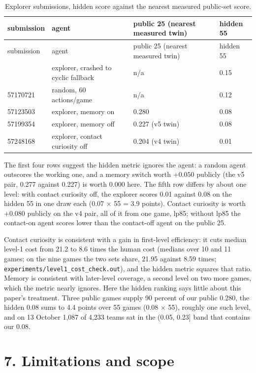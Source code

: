 \documentclass[
  11pt,
]{article}
\begin{document}
\begin{longtable}[]{@{}llll@{}}
\caption{Explorer submissions, hidden score against the nearest measured
public-set score.}\tabularnewline
\toprule\noalign{}
submission & agent & public 25 (nearest measured twin) & hidden 55 \\
\midrule\noalign{}
\endfirsthead
\toprule\noalign{}
submission & agent & public 25 (nearest measured twin) & hidden 55 \\
\midrule\noalign{}
\endhead
\bottomrule\noalign{}
\endlastfoot
57095368 & explorer, crashed to cyclic fallback & n/a & 0.15 \\
57170721 & random, 60 actions/game & n/a & 0.12 \\
57123503 & explorer, memory on & 0.280 & 0.08 \\
57199354 & explorer, memory off & 0.227 (v5 twin) & 0.08 \\
57248168 & explorer, contact curiosity off & 0.204 (v4 twin) & 0.01 \\
\end{longtable}

The first four rows suggest the hidden metric ignores the agent: a
random agent outscores the working one, and a memory switch worth
\(+0.050\) publicly (the v5 pair, 0.277 against 0.227) is worth 0.000
here. The fifth row differs by about one level: with contact curiosity
off, the explorer scores 0.01 against 0.08 on the hidden 55 in one draw
each (0.07 \(\times\) 55 = 3.9 points). Contact curiosity is worth
\(+0.080\) publicly on the v4 pair, all of it from one game, lp85;
without lp85 the contact-on agent scores lower than the contact-off
agent on the public 25.

Contact curiosity is consistent with a gain in first-level efficiency:
it cuts median level-1 cost from 21.2 to 8.6 times the human cost
(medians over 10 and 11 games; on the nine games the two sets share,
21.95 against 8.59 times; \texttt{experiments/level1\_cost\_check.out}),
and the hidden metric squares that ratio. Memory is consistent with
later-level coverage, a second level on two more games, which the metric
nearly ignores. Here the hidden ranking says little about this paper's
treatment. Three public games supply 90 percent of our public 0.280, the
hidden 0.08 sums to 4.4 points over 55 games (0.08 \(\times\) 55),
roughly one such level, and on 13 October 1,087 of 4,233 teams sat in
the (0.05, 0.23{]} band that contains our 0.08.

\section{7. Limitations and scope}\label{limitations-and-scope}
\end{document}
